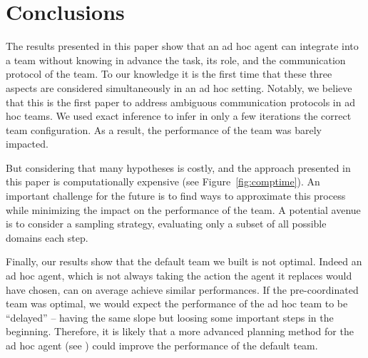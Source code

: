 \section{Conclusions}


The results presented in this paper show that an ad hoc agent can integrate into a team without knowing in advance the task, its role, and the communication protocol of the team. To our knowledge it is the first time that these three aspects are considered simultaneously in an ad hoc setting. Notably, we believe that this is the first paper to address ambiguous communication protocols in ad hoc teams. We used exact inference to infer in only a few iterations the correct team configuration. As a result, the performance of the team was barely impacted.

But considering that many hypotheses is costly, and the approach presented in this paper is computationally expensive (see Figure~\ref{fig:comptime}). An important challenge for the future is to find ways to approximate this process while minimizing the impact on the performance of the team. A potential avenue is to consider a sampling strategy, evaluating only a subset of all possible domains each step.

Finally, our results show that the default team we built is not optimal. Indeed an ad hoc agent, which is not always taking the action the agent it replaces would have chosen, can on average achieve similar performances. If the pre-coordinated team was optimal, we would expect the performance of the ad hoc team to be ``delayed'' -- having the same slope but loosing some important steps in the beginning. Therefore, it is likely that a more advanced planning method for the ad hoc agent (see \cite{barrett2011empirical}) could improve the performance of the default team.

